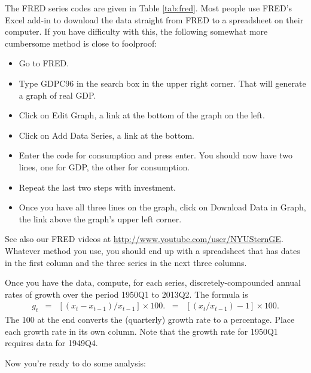 \documentclass[12pt]{exam}
\begin{document}
\begin{questions}
The FRED series codes are given in Table \ref{tab:fred}.
Most people use FRED's Excel add-in to download the
data straight from FRED to a spreadsheet on their computer.
If you have difficulty with this, the following somewhat more cumbersome
method is close to foolproof:
\begin{itemize}
\item Go to FRED.
\item Type GDPC96 in the search box in the upper right corner.
That will generate a graph of real GDP.
\item Click on Edit Graph, a link at the bottom of the graph on the left.
\item Click on Add Data Series, a link at the bottom.
\item Enter the code for consumption and press enter.
You should now have two lines, one for GDP, the other for consumption.
\item Repeat the last two steps with investment.
\item Once you have all three lines on the graph, click on
Download Data in Graph, the link above the graph's upper left corner.
\end{itemize}
See also our FRED videos at \url{http://www.youtube.com/user/NYUSternGE}.
Whatever method you use,
you should end up with a spreadsheet that has dates in the first column
and the three series in the next three columns.

Once you have the data,
compute, for each series,
discretely-compounded annual rates of growth over the period 1950Q1 to 2013Q2.
The formula is
\begin{eqnarray*}
    g_t &=& \left[ \left({x_t}-x_{t-1}\right) /{x_{t-1}}\right] \times 100.
        \;\;=\;\; \left[ \left({x_t}/{x_{t-1}}\right) -1 \right] \times 100.
\end{eqnarray*}
The 100 at the end converts the (quarterly) growth rate to a percentage.
Place each growth rate in its own column.
Note that the growth rate for 1950Q1 requires data for 1949Q4.

Now you're ready to do some analysis:
\end{questions}
\end{document}
